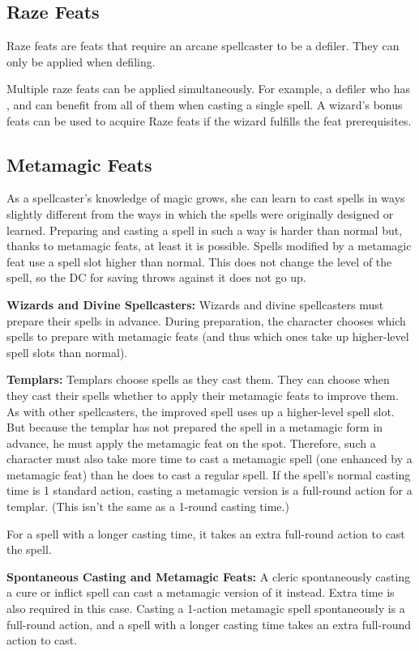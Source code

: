 \subsection{Raze Feats}
Raze feats are feats that require an arcane spellcaster to be a defiler. They can only be applied when defiling.

Multiple raze feats can be applied simultaneously. For example, a defiler who has ,  and  can benefit from all of them when casting a single spell. A wizard's bonus feats can be used to acquire Raze feats if the wizard fulfills the feat prerequisites.

\subsection{Metamagic Feats}
As a spellcaster's knowledge of magic grows, she can learn to cast spells in ways slightly different from the ways in which the spells were originally designed or learned. Preparing and casting a spell in such a way is harder than normal but, thanks to metamagic feats, at least it is possible. Spells modified by a metamagic feat use a spell slot higher than normal. This does not change the level of the spell, so the DC for saving throws against it does not go up.

\textbf{Wizards and Divine Spellcasters:} Wizards and divine spellcasters must prepare their spells in advance. During preparation, the character chooses which spells to prepare with metamagic feats (and thus which ones take up higher-level spell slots than normal).

\textbf{Templars:} Templars choose spells as they cast them. They can choose when they cast their spells whether to apply their metamagic feats to improve them. As with other spellcasters, the improved spell uses up a higher-level spell slot. But because the templar has not prepared the spell in a metamagic form in advance, he must apply the metamagic feat on the spot. Therefore, such a character must also take more time to cast a metamagic spell (one enhanced by a metamagic feat) than he does to cast a regular spell. If the spell's normal casting time is 1 standard action, casting a metamagic version is a full-round action for a templar. (This isn't the same as a 1-round casting time.)

For a spell with a longer casting time, it takes an extra full-round action to cast the spell.

\textbf{Spontaneous Casting and Metamagic Feats:} A cleric spontaneously casting a cure or inflict spell can cast a metamagic version of it instead. Extra time is also required in this case. Casting a 1-action metamagic spell spontaneously is a full-round action, and a spell with a longer casting time takes an extra full-round action to cast.


